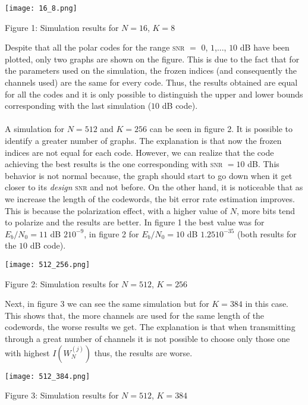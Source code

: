 \documentclass{article}
\begin{document}
\begin{center}
 \texttt{[image: 16\_8.png]}
 \centerline{Figure 1: Simulation results for $N=16$, $K=8$}
\end{center}
\vspace{0.25cm}
Despite that all the polar codes for the range \textsc{snr} $=$ $0$, $1$,..., $10$ dB have been plotted, only two graphs are shown on the figure. This is due to the fact that for the parameters used on the simulation, the frozen indices (and consequently the channels used) are the same for every code. Thus, the results obtained are equal for all the codes and it is only possible to distinguish the upper and lower bounds corresponding with the last simulation ($10$ dB code).
\\\\
A simulation for $N=512$ and $K=256$ can be seen in figure 2. It is possible to identify a greater number of graphs. The explanation is that now the frozen indices are not equal for each code. However, we can realize that the code achieving the best results is the one corresponding with \textsc{snr} $= 10$ dB. This behavior is not normal because, the graph should start to go down when it get closer to its \textit{design} \textsc{snr} and not before. On the other hand, it is noticeable that as we increase the length of the codewords, the bit error rate estimation improves. This is because the polarization effect, with a higher value of $N$, more bits tend to polarize and the results are better. In figure 1 the best value was for $E_b/N_0=11$ dB \approx $ 2$\cdot $10^{-9}$, in figure 2 for $E_b/N_0=10$ dB \approx $ 1.25$\cdot $10^{-35}$ (both results for the $10$ dB code).

\begin{center}
 \texttt{[image: 512\_256.png]}
 \centerline{Figure 2: Simulation results for $N=512$, $K=256$}
\end{center}
\vspace{0.25cm}
Next, in figure 3 we can see the same simulation but for $K=384$ in this case. This shows that, the more channels are used for the same length of the codewords, the worse results we get. The explanation is that when transmitting through a great number of channels it is not possible to choose only those one with highest $I(W_N ^{(j)})$ thus, the results are worse.
\begin{center}
 \texttt{[image: 512\_384.png]}
 \centerline{Figure 3: Simulation results for $N=512$, $K=384$}
\end{center}  
\end{document}
